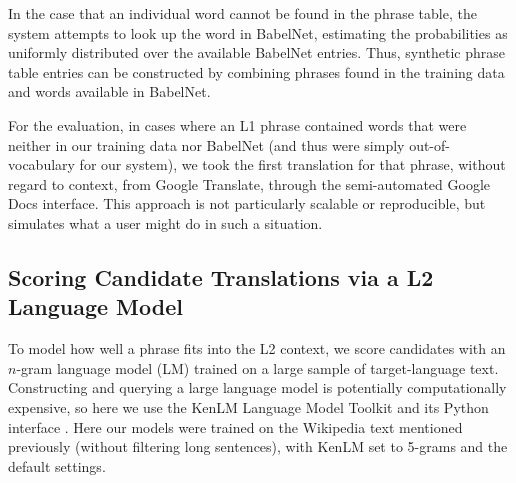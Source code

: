 \documentclass[11pt]{article}
\begin{document}
In the case that an individual word cannot be found in the phrase table, the
system attempts to look up the word in BabelNet, estimating the probabilities
as uniformly distributed over the available BabelNet entries. Thus,
synthetic phrase table entries can be constructed by combining phrases found in
the training data and words available in BabelNet.

For the evaluation, in cases where an L1 phrase contained words that were
neither in our training data nor BabelNet (and thus were simply
out-of-vocabulary for our system), we took the first translation for that
phrase, without regard to context, from Google Translate, through the
semi-automated Google Docs interface. This approach is not particularly
scalable or reproducible, but simulates what a user might do in such a
situation.



\subsection{Scoring Candidate Translations via a L2 Language Model}
\label{sec:l2model}

To model how well a phrase fits into the L2 context, we score candidates 
with an $n$-gram language model (LM) trained on a large sample of
target-language text.
Constructing and querying a large language model is potentially computationally
expensive, so here we use the KenLM Language Model Toolkit and its Python
interface \cite{heafield:kenlm:11}. Here our models were trained on the
Wikipedia text mentioned previously (without filtering long sentences), with
KenLM set to 5-grams and the default settings.
\end{document}
